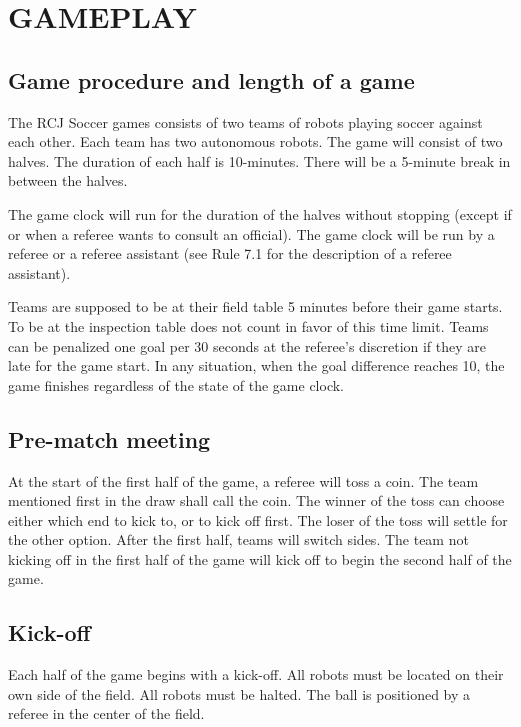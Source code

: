 \documentclass{article}
\begin{document}
\section{GAMEPLAY \label{ref-001}}

\subsection{Game procedure and length of a game \label{ref-002}}

The RCJ Soccer games consists of two teams of robots playing soccer against each other. Each team has two autonomous robots. The game will consist of two halves. The duration of each half is 10-minutes. There will be a 5-minute break in between the halves.

The game clock will run for the duration of the halves without stopping (except if or when a referee wants to consult an official). The game clock will be run by a referee or a referee assistant (see Rule 7.1 for the description of a referee assistant).

Teams are supposed to be at their field table 5 minutes before their game starts. To be at the inspection table does not count in favor of this time limit. Teams can be penalized one goal per 30 seconds at the referee's discretion if they are late for the game start. In any situation, when the goal difference reaches 10, the game finishes regardless of the state of the game clock.

\subsection{Pre-match meeting \label{ref-003}}

At the start of the first half of the game, a referee will toss a coin. The team mentioned first in the draw shall call the coin. The winner of the toss can choose either which end to kick to, or to kick off first. The loser of the toss will settle for the other option. After the first half, teams will switch sides. The team not kicking off in the first half of the game will kick off to begin the second half of the game.

\subsection{Kick-off \label{ref-004}}

Each half of the game begins with a kick-off. All robots must be located on their own side of the field. All robots must be halted. The ball is positioned by a referee in the center of the field.
\end{document}
